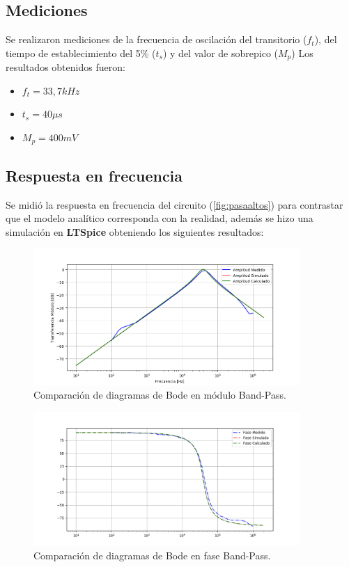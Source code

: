 \subsection{Mediciones}
Se realizaron mediciones de la frecuencia de oscilación del transitorio ($f_t$), del tiempo de establecimiento del 5\% ($t_s$) y del valor de sobrepico ($M_p$)
Los resultados obtenidos fueron:

\begin{itemize}
    \item $f_t=33,7 kHz$
    \item $t_s=40\mu s$
    \item $M_p=400 mV$
\end{itemize}

\subsection{Respuesta en frecuencia}
Se midió la respuesta en frecuencia del circuito (\ref{fig:pasaaltos}) para contrastar que el modelo analítico corresponda con la realidad, además se hizo una simulación en \textbf{LTSpice} obteniendo los siguientes resultados:

\begin{figure}[H]
	\centering
	\includegraphics[width=0.9\textwidth]{Bodes_Labo/Fotos/BP.png}
\caption{Comparación de diagramas de Bode en módulo Band-Pass.}
	\label{fig:BODEHP}
\end{figure}

\begin{figure}[H]
	\centering
	\includegraphics[width=0.9\textwidth]{Bodes_Labo/Fotos/BPP.png}
\caption{Comparación de diagramas de Bode en fase Band-Pass.}
	\label{fig:BODEBPP}
\end{figure}

